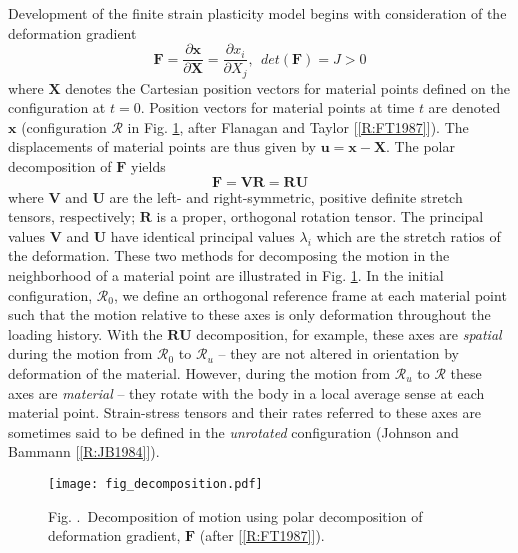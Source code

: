 \documentclass[11pt]{report}
\numberwithin{equation}{section}
\newcommand{\bmf } {\boldsymbol }  %
\newcommand{\ti}{\emph}
\newcommand{\nid}{\noindent}
\newcommand{\region}{\bm{\mathcal{R}}}
\renewcommand{\thefigure}{\thesection.\arabic{figure}}
\begin{document}
\nid Development of the finite strain plasticity model begins with consideration 
of the deformation gradient
%
\begin{equation}\label{E:KSSMa}
\mathbf{F} = \frac{\partial \bmf{x}}{\partial \bmf{X}} = \frac{\partial x_i}{\partial X_j},\ \ det(\mathbf{F}) = J > 0
\end{equation}
%
\nid where $\bmf{X}$ denotes the Cartesian position vectors for material points 
defined on the configuration at $t=0$. Position vectors for material points at time $t$ 
are denoted $\bmf{x}$ (configuration $\region$ in Fig. \ref{fig:motion}, 
after Flanagan and Taylor [\ref{R:FT1987}]). The 
displacements of material points are thus given by $\bmf{u = x- X}$. 
The polar decomposition of $\mathbf{F}$ yields
%
\begin{equation}\label{E:KSSMb}
\mathbf{F} = \mathbf{V}\mathbf{R}=\mathbf{R}\mathbf{U} 
\end{equation}
%
where $\mathbf{V}$ and $\mathbf{U}$ are the left- and right-symmetric, 
positive definite stretch tensors, 
respectively; $\mathbf{R}$ is a proper, orthogonal rotation tensor. The principal values 
$\mathbf{V}$ and $\mathbf{U}$ have identical principal values  $\lambda_i$ which are the stretch
ratios of the deformation. These two methods for decomposing the motion  
in the neighborhood of a material point are illustrated in Fig. \ref{fig:motion}.
In the initial configuration, $\region_0$, we define an orthogonal 
reference frame at each material point such that the motion relative to these axes is 
only deformation throughout the loading history. With the $\mathbf{RU}$ 
decomposition, for example, these axes are \ti{spatial} during the 
motion from $\region_0$ to $\region_u$ -- they are not altered in orientation
by deformation of the material. 
However, during the motion from $\region_u$ to $\region$ these axes 
are \ti{material} -- they rotate with the body in a local average sense 
at each material point. 
Strain-stress tensors and their rates referred to these axes are 
sometimes said to be defined in the \ti{unrotated} configuration  
(Johnson and Bammann [\ref{R:JB1984}]).

%
\begin{figure}[h]
\begin{center}
\texttt{[image: fig\_decomposition.pdf]} 
\caption{{\small Fig. \thefigure\ Decomposition of motion using polar 
decomposition of deformation gradient, $\mathbf{F}$ (after [\ref{R:FT1987}]).}
\label{fig:motion}}
%
\end{center}
\end{figure}
%
\end{document}
